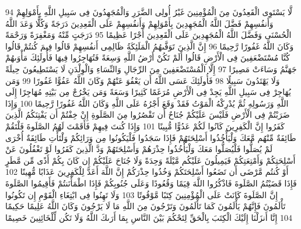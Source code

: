 {\tiny\colorbox{cl_aya}{94}} لَّا يَسْتَوِى الْقَعِدُونَ مِنَ الْمُؤْمِنِينَ غَيْرُ أُولِى الضَّرَرِ وَالْمُجَهِدُونَ فِى سَبِيلِ اللَّهِ بِأَمْوَلِهِمْ وَأَنفُسِهِمْ فَضَّلَ اللَّهُ الْمُجَهِدِينَ بِأَمْوَلِهِمْ وَأَنفُسِهِمْ عَلَى الْقَعِدِينَ دَرَجَةً وَكُلًّا وَعَدَ اللَّهُ الْحُسْنَى وَفَضَّلَ اللَّهُ الْمُجَهِدِينَ عَلَى الْقَعِدِينَ أَجْرًا عَظِيمًا
{\tiny\colorbox{cl_aya}{95}} دَرَجَتٍ مِّنْهُ وَمَغْفِرَةً وَرَحْمَةً وَكَانَ اللَّهُ غَفُورًا رَّحِيمًا
{\tiny\colorbox{cl_aya}{96}} إِنَّ الَّذِينَ تَوَفَّىهُمُ الْمَلَئِكَةُ ظَالِمِى أَنفُسِهِمْ قَالُوا فِيمَ كُنتُمْ قَالُوا كُنَّا مُسْتَضْعَفِينَ فِى الْأَرْضِ قَالُوا أَلَمْ تَكُنْ أَرْضُ اللَّهِ وَسِعَةً فَتُهَاجِرُوا فِيهَا فَأُولَئِكَ مَأْوَىهُمْ جَهَنَّمُ وَسَاءَتْ مَصِيرًا
{\tiny\colorbox{cl_aya}{97}} إِلَّا الْمُسْتَضْعَفِينَ مِنَ الرِّجَالِ وَالنِّسَاءِ وَالْوِلْدَنِ لَا يَسْتَطِيعُونَ حِيلَةً وَلَا يَهْتَدُونَ سَبِيلًا
{\tiny\colorbox{cl_aya}{98}} فَأُولَئِكَ عَسَى اللَّهُ أَن يَعْفُوَ عَنْهُمْ وَكَانَ اللَّهُ عَفُوًّا غَفُورًا
{\tiny\colorbox{cl_aya}{99}} وَمَن يُهَاجِرْ فِى سَبِيلِ اللَّهِ يَجِدْ فِى الْأَرْضِ مُرَغَمًا كَثِيرًا وَسَعَةً وَمَن يَخْرُجْ مِن بَيْتِهِ مُهَاجِرًا إِلَى اللَّهِ وَرَسُولِهِ ثُمَّ يُدْرِكْهُ الْمَوْتُ فَقَدْ وَقَعَ أَجْرُهُ عَلَى اللَّهِ وَكَانَ اللَّهُ غَفُورًا رَّحِيمًا
{\tiny\colorbox{cl_aya}{100}} وَإِذَا ضَرَبْتُمْ فِى الْأَرْضِ فَلَيْسَ عَلَيْكُمْ جُنَاحٌ أَن تَقْصُرُوا مِنَ الصَّلَوةِ إِنْ خِفْتُمْ أَن يَفْتِنَكُمُ الَّذِينَ كَفَرُوا إِنَّ الْكَفِرِينَ كَانُوا لَكُمْ عَدُوًّا مُّبِينًا
{\tiny\colorbox{cl_aya}{101}} وَإِذَا كُنتَ فِيهِمْ فَأَقَمْتَ لَهُمُ الصَّلَوةَ فَلْتَقُمْ طَائِفَةٌ مِّنْهُم مَّعَكَ وَلْيَأْخُذُوا أَسْلِحَتَهُمْ فَإِذَا سَجَدُوا فَلْيَكُونُوا مِن وَرَائِكُمْ وَلْتَأْتِ طَائِفَةٌ أُخْرَى لَمْ يُصَلُّوا فَلْيُصَلُّوا مَعَكَ وَلْيَأْخُذُوا حِذْرَهُمْ وَأَسْلِحَتَهُمْ وَدَّ الَّذِينَ كَفَرُوا لَوْ تَغْفُلُونَ عَنْ أَسْلِحَتِكُمْ وَأَمْتِعَتِكُمْ فَيَمِيلُونَ عَلَيْكُم مَّيْلَةً وَحِدَةً وَلَا جُنَاحَ عَلَيْكُمْ إِن كَانَ بِكُمْ أَذًى مِّن مَّطَرٍ أَوْ كُنتُم مَّرْضَى أَن تَضَعُوا أَسْلِحَتَكُمْ وَخُذُوا حِذْرَكُمْ إِنَّ اللَّهَ أَعَدَّ لِلْكَفِرِينَ عَذَابًا مُّهِينًا
{\tiny\colorbox{cl_aya}{102}} فَإِذَا قَضَيْتُمُ الصَّلَوةَ فَاذْكُرُوا اللَّهَ قِيَمًا وَقُعُودًا وَعَلَى جُنُوبِكُمْ فَإِذَا اطْمَأْنَنتُمْ فَأَقِيمُوا الصَّلَوةَ إِنَّ الصَّلَوةَ كَانَتْ عَلَى الْمُؤْمِنِينَ كِتَبًا مَّوْقُوتًا
{\tiny\colorbox{cl_aya}{103}} وَلَا تَهِنُوا فِى ابْتِغَاءِ الْقَوْمِ إِن تَكُونُوا تَأْلَمُونَ فَإِنَّهُمْ يَأْلَمُونَ كَمَا تَأْلَمُونَ وَتَرْجُونَ مِنَ اللَّهِ مَا لَا يَرْجُونَ وَكَانَ اللَّهُ عَلِيمًا حَكِيمًا
{\tiny\colorbox{cl_aya}{104}} إِنَّا أَنزَلْنَا إِلَيْكَ الْكِتَبَ بِالْحَقِّ لِتَحْكُمَ بَيْنَ النَّاسِ بِمَا أَرَىكَ اللَّهُ وَلَا تَكُن لِّلْخَائِنِينَ خَصِيمًا
